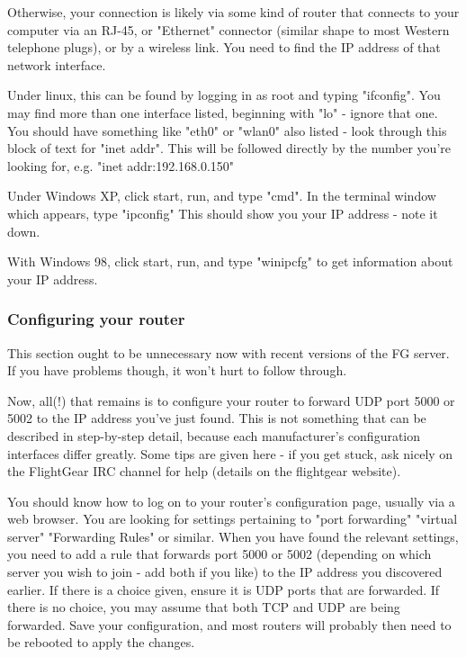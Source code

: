 Otherwise, your connection is likely via some kind of router that connects to your computer via an RJ-45, or "Ethernet" connector 
(similar shape to most Western telephone plugs), or by a wireless link. You need to find the IP address of that network interface.

Under linux, this can be found by logging in as root and typing "ifconfig". You may find more than one interface listed, 
beginning with "lo" - ignore that one. You should have something like "eth0" or "wlan0" also listed - look through this block 
of text for "inet addr". This will be followed directly by the number you're looking for, e.g. "inet addr:192.168.0.150"

Under Windows XP, click start, run, and type "cmd". In the terminal window which appears, type "ipconfig" 
This should show you your IP address - note it down.

With Windows 98, click start, run, and type "winipcfg" to get information about your IP address.

\subsubsection{Configuring your router}

This section ought to be unnecessary now with recent versions of the FG server.  If you have problems though, 
it won't hurt to follow through.

Now, all(!) that remains is to configure your router to forward UDP port 5000 or 5002 to the IP address you've just found. 
This is not something that can be described in step-by-step detail, because each manufacturer's configuration interfaces 
differ greatly. Some tips are given here - if you get stuck, ask nicely on the FlightGear IRC channel for help (details 
on the flightgear website).

You should know how to log on to your router's configuration page, usually via a web browser. You are looking for settings 
pertaining to "port forwarding" "virtual server" "Forwarding Rules" or similar. When you have found the relevant settings, 
you need to add a rule that forwards port 5000 or 5002 (depending on which server you wish to join - add both if you like) 
to the IP address you discovered earlier. If there is a choice given, ensure it is UDP ports that are forwarded. If there 
is no choice, you may assume that both TCP and UDP are being forwarded. Save your configuration, and most routers will 
probably then need to be rebooted to apply the changes.

